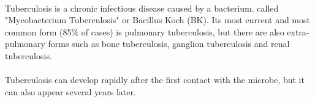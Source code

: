 \paragraph{}
Tuberculosis is a chronic infectious disease caused by a bacterium. called "Mycobacterium Tuberculosis" or Bacillus Koch (BK). Its most current and most common form (85\% of cases) is pulmonary tuberculosis, but there are also extra-pulmonary forms such as bone tuberculosis, ganglion tuberculosis and renal tuberculosis.
\paragraph{}
Tuberculosis can develop rapidly after the first contact with the microbe, but it can also appear several years later.
